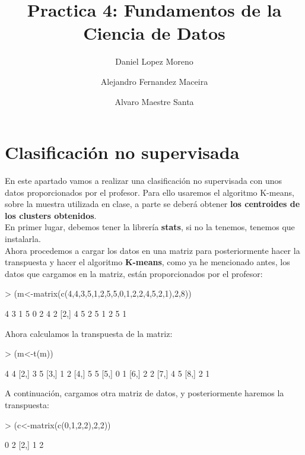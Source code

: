 \documentclass [a4paper] {article}
\title{Practica 4: Fundamentos de la Ciencia de Datos}
\author{
  Daniel Lopez Moreno\\
  \and
  Alejandro Fernandez Maceira\\
  \and
  Alvaro Maestre Santa
}
\begin{document}
\maketitle

\section{Clasificación no supervisada}
En este apartado vamos a realizar una clasificación no supervisada con unos datos proporcionados
por el profesor. Para ello usaremos el algoritmo K-means, sobre la muestra utilizada en clase, a 
parte se deberá obtener \textbf{los centroides de los clusters obtenidos}.\\
En primer lugar, debemos tener la librería \textbf{stats}, si no la tenemos, tenemos que instalarla.\\

Ahora procedemos a cargar los datos en una matriz para posteriormente hacer la transpuesta y hacer el
algoritmo \textbf{K-means}, como ya he mencionado antes, los datos que cargamos en la matriz, están proporcionados
por el profesor:

\begin{Schunk}
\begin{Sinput}
> (m<-matrix(c(4,4,3,5,1,2,5,5,0,1,2,2,4,5,2,1),2,8))
\end{Sinput}
\begin{Soutput}
     [,1] [,2] [,3] [,4] [,5] [,6] [,7] [,8]
[1,]    4    3    1    5    0    2    4    2
[2,]    4    5    2    5    1    2    5    1
\end{Soutput}
\end{Schunk}

Ahora calculamos la transpuesta de la matriz:

\begin{Schunk}
\begin{Sinput}
> (m<-t(m))
\end{Sinput}
\begin{Soutput}
     [,1] [,2]
[1,]    4    4
[2,]    3    5
[3,]    1    2
[4,]    5    5
[5,]    0    1
[6,]    2    2
[7,]    4    5
[8,]    2    1
\end{Soutput}
\end{Schunk}

A continuación, cargamos otra matriz de datos, y posteriormente haremos la transpuesta:

\begin{Schunk}
\begin{Sinput}
> (c<-matrix(c(0,1,2,2),2,2))
\end{Sinput}
\begin{Soutput}
     [,1] [,2]
[1,]    0    2
[2,]    1    2
\end{Soutput}
\end{Schunk}
\end{document}
